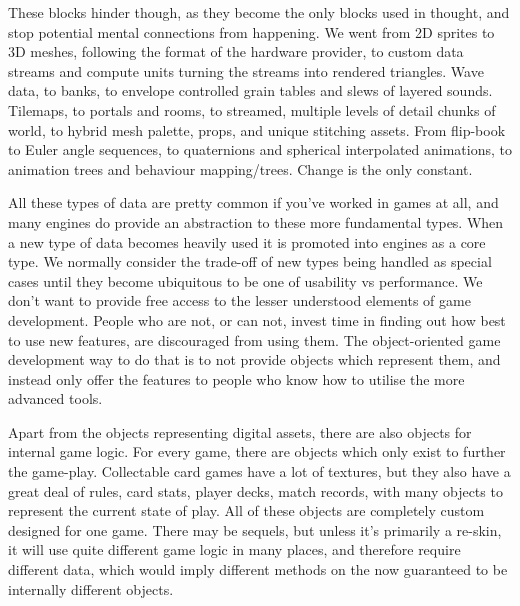 \documentclass[a4paper,12pt]{article}
\begin{document}
These blocks hinder though, as they become the only blocks used in thought, and stop potential mental connections from happening.
We went from 2D sprites to 3D meshes, following the format of the hardware provider, to custom data streams and compute units turning the streams into rendered triangles.
Wave data, to banks, to envelope controlled grain tables and slews of layered sounds.
Tilemaps, to portals and rooms, to streamed, multiple levels of detail chunks of world, to hybrid mesh palette, props, and unique stitching assets.
From flip-book to Euler angle sequences, to quaternions and spherical interpolated animations, to animation trees and behaviour mapping/trees.
Change is the only constant.

All these types of data are pretty common if you've worked in games at all, and many engines do provide an abstraction to these more fundamental types.
When a new type of data becomes heavily used it is promoted into engines as a core type.
We normally consider the trade-off of new types being handled as special cases until they become ubiquitous to be one of usability vs performance.
We don't want to provide free access to the lesser understood elements of game development.
People who are not, or can not, invest time in finding out how best to use new features, are discouraged from using them.
The object-oriented game development way to do that is to not provide objects which represent them, and instead only offer the features to people who know how to utilise the more advanced tools.

Apart from the objects representing digital assets, there are also objects for internal game logic.
For every game, there are objects which only exist to further the game-play.
Collectable card games have a lot of textures, but they also have a great deal of rules, card stats, player decks, match records, with many objects to represent the current state of play.
All of these objects are completely custom designed for one game.
There may be sequels, but unless it's primarily a re-skin, it will use quite different game logic in many places, and therefore require different data, which would imply different methods on the now guaranteed to be internally different objects.
\end{document}
